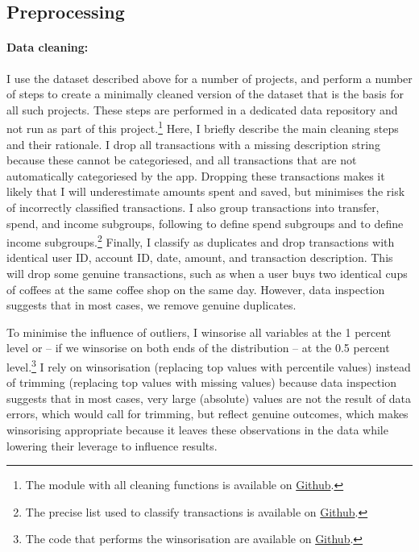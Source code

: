 \subsection{Preprocessing}%
\label{sub:preprocessing}

\paragraph{Data cleaning:}%
\label{par:data_cleaning}

I use the dataset described above for a number of projects, and perform a
number of steps to create a minimally cleaned version of the dataset that is
the basis for all such projects. These steps are performed in a dedicated data
repository and not run as part of this project.\footnote{The module with all
cleaning functions is available on
\href{https:/egithub.com/fabiangunzinger/mdb_eval/blob/f51e49c95c5884d2dc417be23921a8acd85aec9d/src/data/clean.py}{Github}.}
Here, I briefly describe the main cleaning steps and their rationale. I drop
all transactions with a missing description string because these cannot be
categoriesed, and all transactions that are not automatically categoriesed by
the app. Dropping these transactions makes it likely that I will underestimate
amounts spent and saved, but minimises the risk of incorrectly classified
transactions. I also group transactions into transfer, spend, and income
subgroups, following \citet{muggleton2020evidence} to define spend subgroups
and \citet{hacioglu2021distributional} to define income subgroups.\footnote{
The precise list used to classify transactions is available on
\href{https://github.com/fabiangunzinger/mdb_eval/blob/92af366d4c4052cc7a7f78a6178086de8ecdfb75/src/data/txn_classifications.py}{Github}.}
Finally, I classify as duplicates and drop transactions with identical user ID,
account ID, date, amount, and transaction description. This will drop some
genuine transactions, such as when a user buys two identical cups of coffees at
the same coffee shop on the same day. However, data inspection suggests that in
most cases, we remove genuine duplicates.

To minimise the influence of outliers, I winsorise all variables at the 1
percent level or -- if we winsorise on both ends of the distribution -- at the
0.5 percent level.\footnote{The code that performs the winsorisation are
    available on
\href{https://github.com/fabiangunzinger/mdb_eval/blob/d04fe186bb5cca884af2b7c1c7ad429674ef701d/src/data/transformers.py}{Github}.}
I rely on winsorisation (replacing top values with percentile values) instead
of trimming (replacing top values with missing values) because data inspection
suggests that in most cases, very large (absolute) values are not the result of
data errors, which would call for trimming, but reflect genuine outcomes, which
makes winsorising appropriate because it leaves these observations in the data
while lowering their leverage to influence results.


